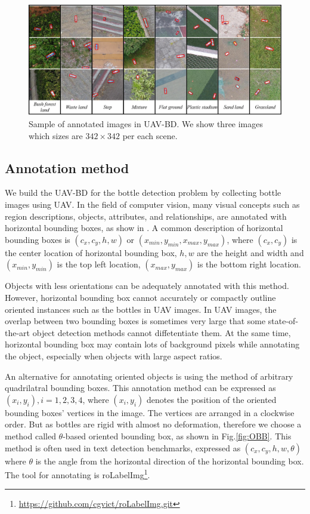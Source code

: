 \begin{figure}
	\includegraphics[width=\linewidth]{images/UAV-BD2.png}
	\caption{Sample of annotated images in UAV-BD. We show three images which sizes are $ 342\times 342 $ per each scene.}
	\label{fig:dataset-cut-image}
\end{figure}


\subsection{Annotation method}
\label{ssec:annotation_method}

We build the UAV-BD for the bottle detection problem by collecting bottle images using UAV. In the field of computer vision, many visual concepts such as region descriptions, objects, attributes, and relationships, are annotated with horizontal bounding boxes, as show in \cite{DOTA, boundingbox}. A common description of horizontal bounding boxes is $(c_x, c_y, h, w)$ or $ (x_{min}, y_{min}, x_{max}, y_{max}) $, where $(c_x, c_y)$ is the center location of horizontal bounding box, $h, w$ are the height and width and $ (x_{min}, y_{min}) $ is the top left location, $ (x_{max}, y_{max}) $ is the bottom right location\cite{DOTA}. 

Objects with less orientations can be adequately annotated with this method. However, horizontal bounding box cannot accurately or compactly outline oriented instances such as the bottles in UAV images. In UAV images, the overlap between two bounding boxes is sometimes very large that some state-of-the-art object detection methods cannot diffetentiate them\cite{DOTA}. At the same time, horizontal bounding box may contain lots of background pixels while annotating the object, especially when objects with large aspect ratios. 

An alternative for annotating oriented objects is using the method of arbitrary quadrilatral bounding boxes. This annotation method can be expressed as ${(x_i, y_i), i=1,2,3,4}$, where $(x_i, y_i)$ denotes the position of the oriented bounding boxes' vertices in the image\cite{DOTA}. The vertices are arranged in a clockwise order. But as bottles are rigid with almost no deformation, therefore we choose a method called $\theta$-based oriented bounding box, as shown in Fig.\ref{fig:OBB}. This method is often used in text detection benchmarks, expressed as $(c_x, c_y, h, w, \theta)$ where $\theta$ is the angle from the horizontal direction of the horizontal bounding box\cite{DOTA}. The tool for annotating is roLabelImg\footnote{\url{https://github.com/cgvict/roLabelImg.git}}.

